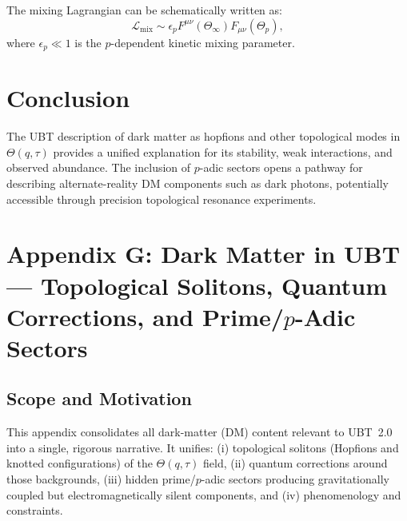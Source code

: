 The mixing Lagrangian can be schematically written as:
\begin{equation}
\mathcal{L}_{\mathrm{mix}} \sim \epsilon_{p} F^{\mu\nu}(\Theta_{\infty}) F_{\mu\nu}(\Theta_p),
\end{equation}
where $\epsilon_{p} \ll 1$ is the $p$-dependent kinetic mixing parameter.

\section{Conclusion}
The UBT description of dark matter as hopfions and other topological modes in $\Theta(q,\tau)$ provides a unified explanation for its stability, weak interactions, and observed abundance. The inclusion of $p$-adic sectors opens a pathway for describing alternate-reality DM components such as dark photons, potentially accessible through precision topological resonance experiments.

\section{Appendix G: Dark Matter in UBT --- Topological Solitons, Quantum Corrections, and Prime/$p$-Adic Sectors}
\label{app:dm-consolidated}

\subsection{Scope and Motivation}
This appendix consolidates all dark-matter (DM) content relevant to UBT~2.0 into a single, rigorous narrative.
It unifies: (i) topological solitons (Hopfions and knotted configurations) of the $\Theta(q,\tau)$ field,
(ii) quantum corrections around those backgrounds, (iii) hidden prime/$p$-adic sectors producing gravitationally coupled but electromagnetically silent components,
and (iv) phenomenology and constraints.

